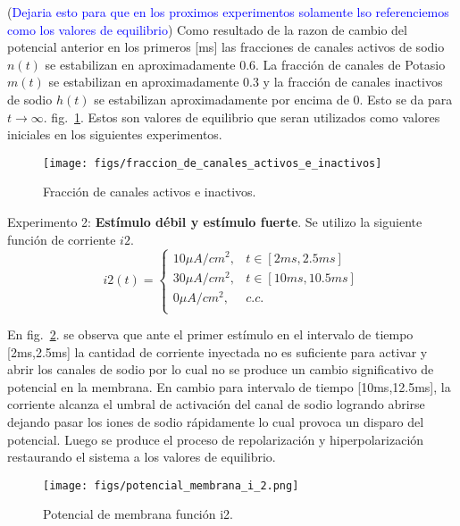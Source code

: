 \documentclass[aps,prl,twocolumn,groupedaddress]{revtex4-2}
\begin{document}
(\textcolor{blue}{Dejaria esto para que en los proximos experimentos solamente lso referenciemos como los valores de equilibrio})
Como resultado de la razon de cambio del potencial anterior en los primeros [ms] las fracciones de canales activos de sodio $n(t)$ se estabilizan en aproximadamente 0.6. La fracción de canales de Potasio $m(t)$ se estabilizan en aproximadamente 0.3 y la fracción de canales inactivos de sodio $h(t)$ se estabilizan aproximadamente por encima de 0. Esto se da para ${t \to \infty}$. fig.~\ref{fig2}. Estos son valores de equilibrio que seran utilizados como valores iniciales en los siguientes experimentos.\\


\begin{figure}[h!]
\centering
\texttt{[image: figs/fraccion\_de\_canales\_activos\_e\_inactivos]}
\caption{Fracción de canales activos e inactivos. \label{fig2}}
\end{figure}


Experimento 2: \textbf{Estímulo débil y estímulo fuerte}. Se utilizo la siguiente función de corriente $i2$.\\
$$
i2(t) = \left\{
\begin{array}{ll}
10 \mu A/cm^2, & t\in [2ms,2.5ms] \\
30 \mu A/cm^2, & t\in [10ms,10.5ms] \\
0 \mu A/cm^2, & c.c. \\
\end{array}
\right.
$$
 
En fig.~\ref{fig3}. se observa que ante el primer estímulo en el intervalo de tiempo [2ms,2.5ms] la cantidad de corriente inyectada no es suficiente para activar y abrir los canales de sodio por lo cual no se produce un cambio significativo de potencial en la membrana. En cambio para intervalo de tiempo [10ms,12.5ms], la corriente alcanza el umbral de activación del canal de sodio logrando abrirse dejando pasar los iones de sodio rápidamente lo cual provoca un disparo del potencial. Luego se produce el proceso de repolarización y hiperpolarización  restaurando el sistema a los valores de equilibrio.\\


\begin{figure}[h!]
\centering
\texttt{[image: figs/potencial\_membrana\_i\_2.png]}
\caption{Potencial de membrana función i2. \label{fig3}}
\end{figure}
\end{document}
